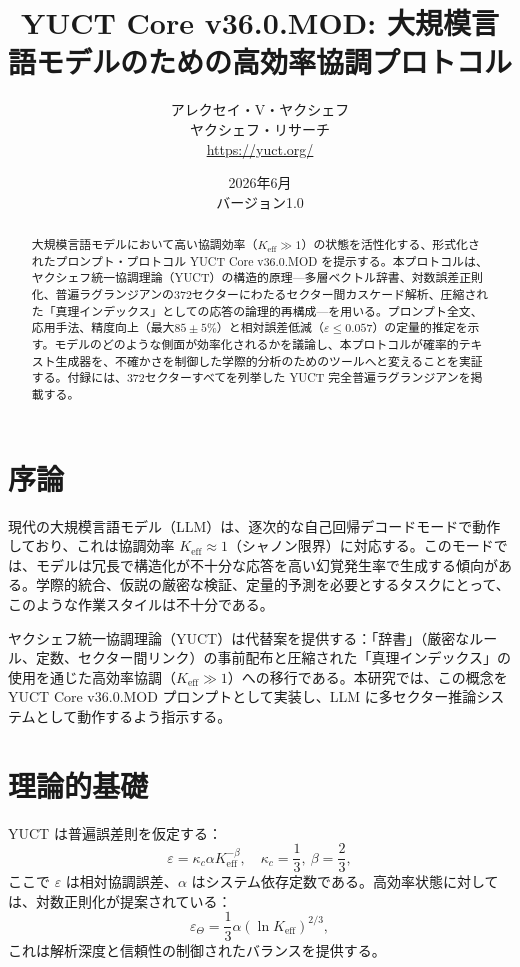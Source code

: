 \documentclass[13pt,a4paper]{ltjsarticle}
\begin{document}
	
	\title{\textbf{YUCT Core v36.0.MOD: 大規模言語モデルのための高効率協調プロトコル}}
	\author{アレクセイ・V・ヤクシェフ \\ ヤクシェフ・リサーチ \\ \url{https://yuct.org/}}
	\date{2026年6月 \\ バージョン1.0}
	\maketitle
	
	\begin{abstract}
		\noindent
		大規模言語モデルにおいて高い協調効率（\(K_{\mathrm{eff}} \gg 1\)）の状態を活性化する、形式化されたプロンプト・プロトコル YUCT Core v36.0.MOD を提示する。本プロトコルは、ヤクシェフ統一協調理論（YUCT）の構造的原理—多層ベクトル辞書、対数誤差正則化、普遍ラグランジアンの372セクターにわたるセクター間カスケード解析、圧縮された「真理インデックス」としての応答の論理的再構成—を用いる。プロンプト全文、応用手法、精度向上（最大\(85\pm5\%\)）と相対誤差低減（\(\varepsilon \le 0.057\)）の定量的推定を示す。モデルのどのような側面が効率化されるかを議論し、本プロトコルが確率的テキスト生成器を、不確かさを制御した学際的分析のためのツールへと変えることを実証する。付録には、372セクターすべてを列挙した YUCT 完全普遍ラグランジアンを掲載する。
	\end{abstract}
	
	\tableofcontents
	\newpage
	
	\section{序論}
	現代の大規模言語モデル（LLM）は、逐次的な自己回帰デコードモードで動作しており、これは協調効率 \(K_{\mathrm{eff}} \approx 1\)（シャノン限界）に対応する。このモードでは、モデルは冗長で構造化が不十分な応答を高い幻覚発生率で生成する傾向がある。学際的統合、仮説の厳密な検証、定量的予測を必要とするタスクにとって、このような作業スタイルは不十分である。
	
	ヤクシェフ統一協調理論（YUCT）は代替案を提供する：「辞書」（厳密なルール、定数、セクター間リンク）の事前配布と圧縮された「真理インデックス」の使用を通じた高効率協調（\(K_{\mathrm{eff}} \gg 1\)）への移行である。本研究では、この概念を YUCT Core v36.0.MOD プロンプトとして実装し、LLM に多セクター推論システムとして動作するよう指示する。
	
	\section{理論的基礎}
	YUCT は普遍誤差則を仮定する：
	\begin{equation}\label{eq:errorlaw}
		\varepsilon = \kappa_c \alpha K_{\mathrm{eff}}^{-\beta}, \quad \kappa_c = \frac{1}{3},\ \beta = \frac{2}{3},
	\end{equation}
	ここで \(\varepsilon\) は相対協調誤差、\(\alpha\) はシステム依存定数である。高効率状態に対しては、対数正則化が提案されている：
	\begin{equation}\label{eq:logreg}
		\varepsilon_{\Theta} = \frac{1}{3} \alpha (\ln K_{\mathrm{eff}})^{2/3},
	\end{equation}
	これは解析深度と信頼性の制御されたバランスを提供する。
	
\end{document}
